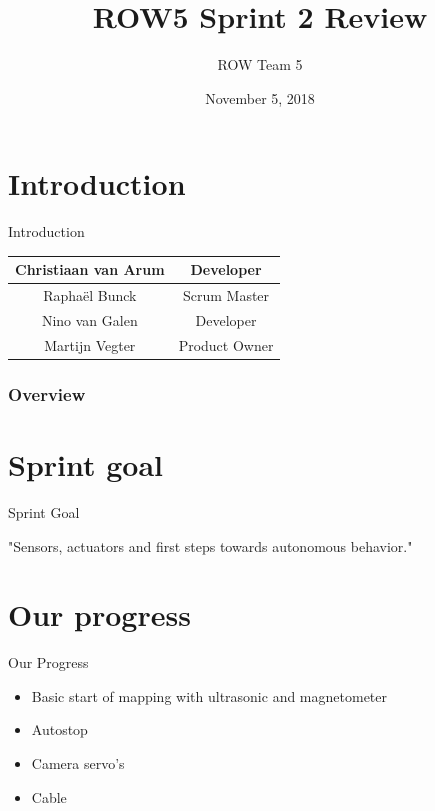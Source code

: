\documentclass{beamer}
\title[Sprint Review]{ROW5 Sprint 2 Review}
\author{ROW Team 5}
\institute[HvA]
{
	Amsterdam University of Applied Sciences \\
	\textit{https://rescueonwheels.github.io/}
}
\date{November 5, 2018}
\begin{document}
\begin{frame}
\titlepage %
\end{frame}

\section{Introduction}
\begin{frame}{Introduction}
    \begin{center}
        \begin{tabular}{c|c}
             Christiaan van Arum    & Developer \\
             \hline
             Rapha\"{e}l Bunck & Scrum Master \\
             \hline
             Nino van Galen & Developer \\
             \hline
             Martijn Vegter & Product Owner
         \end{tabular}
    \end{center}
\end{frame}

\begin{frame}
\frametitle{Overview} %
\tableofcontents %
\end{frame}

\section{Sprint goal}
\begin{frame}{Sprint Goal}
\normalsize{\centerline{"Sensors, actuators and first steps towards autonomous behavior."}}
\end{frame}

\section{Our progress}
\begin{frame}{Our Progress}
    \begin{itemize}
    \item Basic start of mapping with ultrasonic and magnetometer
    \item Autostop
    \item Camera servo's
    \item Cable
\end{itemize}
\end{frame}
\end{document}

